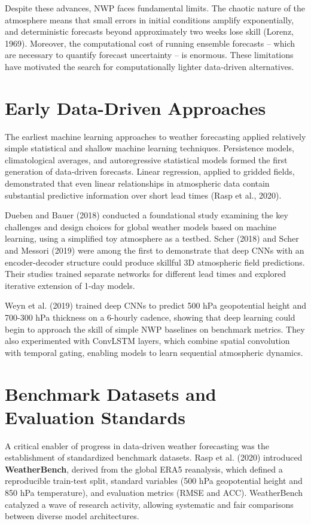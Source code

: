 \documentclass[12pt,a4paper,oneside]{report}
\begin{document}
Despite these advances, NWP faces fundamental limits. The chaotic nature of the atmosphere means that small errors in initial conditions amplify exponentially, and deterministic forecasts beyond approximately two weeks lose skill (Lorenz, 1969). Moreover, the computational cost of running ensemble forecasts -- which are necessary to quantify forecast uncertainty -- is enormous. These limitations have motivated the search for computationally lighter data-driven alternatives.

\section{Early Data-Driven Approaches}

The earliest machine learning approaches to weather forecasting applied relatively simple statistical and shallow machine learning techniques. Persistence models, climatological averages, and autoregressive statistical models formed the first generation of data-driven forecasts. Linear regression, applied to gridded fields, demonstrated that even linear relationships in atmospheric data contain substantial predictive information over short lead times (Rasp et al., 2020).

Dueben and Bauer (2018) conducted a foundational study examining the key challenges and design choices for global weather models based on machine learning, using a simplified toy atmosphere as a testbed. Scher (2018) and Scher and Messori (2019) were among the first to demonstrate that deep CNNs with an encoder-decoder structure could produce skillful 3D atmospheric field predictions. Their studies trained separate networks for different lead times and explored iterative extension of 1-day models.

Weyn et al. (2019) trained deep CNNs to predict 500 hPa geopotential height and 700-300 hPa thickness on a 6-hourly cadence, showing that deep learning could begin to approach the skill of simple NWP baselines on benchmark metrics. They also experimented with ConvLSTM layers, which combine spatial convolution with temporal gating, enabling models to learn sequential atmospheric dynamics.

\section{Benchmark Datasets and Evaluation Standards}

A critical enabler of progress in data-driven weather forecasting was the establishment of standardized benchmark datasets. Rasp et al. (2020) introduced \textbf{WeatherBench}, derived from the global ERA5 reanalysis, which defined a reproducible train-test split, standard variables (500 hPa geopotential height and 850 hPa temperature), and evaluation metrics (RMSE and ACC). WeatherBench catalyzed a wave of research activity, allowing systematic and fair comparisons between diverse model architectures.
\end{document}
